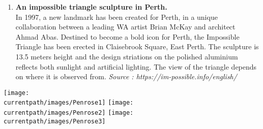 \begin{enigme}
\begin{enumerate}
       \item {\bf An impossible triangle sculpture in Perth.} \\
          In 1997, a new landmark has been created for Perth, in a unique collaboration between a leading WA artist Brian McKay and architect Ahmad Abas. Destined to become a bold icon for Perth, the \og Impossible Triangle \fg{} has been erected in Claisebrook Square, East Perth. The sculpture is 13.5 meters height and the design striations on the polished aluminium reflects both sunlight and artificial lighting. The view of the triangle depends on where it is observed from. \hfill {\footnotesize\it Source : https://im-possible.info/english/}
       \end{enumerate}
       \begin{center}
          \texttt{[image: \\currentpath/images/Penrose1]} \qquad \texttt{[image: \\currentpath/images/Penrose2]} \qquad \texttt{[image: \\currentpath/images/Penrose3]}
       \end{center}
\end{enigme}  
%     
